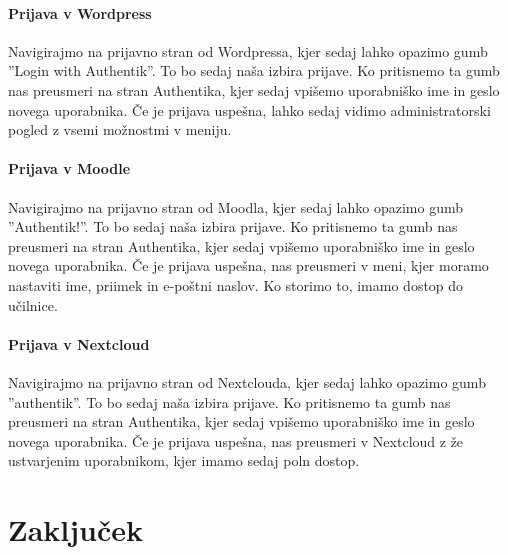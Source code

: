 \documentclass[a4paper,12pt,openright]{book}
\begin{document}
\subsubsection{Prijava v Wordpress}
Navigirajmo na prijavno stran od Wordpressa, kjer sedaj lahko opazimo gumb ''Login with Authentik''. To bo sedaj naša izbira prijave. Ko pritisnemo ta gumb nas preusmeri na stran Authentika, kjer sedaj vpišemo uporabniško ime in geslo novega uporabnika. Če je prijava uspešna, lahko sedaj vidimo administratorski pogled z vsemi možnostmi v meniju. 

\subsubsection{Prijava v Moodle}
Navigirajmo na prijavno stran od Moodla, kjer sedaj lahko opazimo gumb ''Authentik!''. To bo sedaj naša izbira prijave. Ko pritisnemo ta gumb nas preusmeri na stran Authentika, kjer sedaj vpišemo uporabniško ime in geslo novega uporabnika. Če je prijava uspešna, nas preusmeri v meni, kjer moramo nastaviti ime, priimek in e-poštni naslov. Ko storimo to, imamo dostop do učilnice. 

\subsubsection{Prijava v Nextcloud}
Navigirajmo na prijavno stran od Nextclouda, kjer sedaj lahko opazimo gumb ''authentik''. To bo sedaj naša izbira prijave. Ko pritisnemo ta gumb nas preusmeri na stran Authentika, kjer sedaj vpišemo uporabniško ime in geslo novega uporabnika. Če je prijava uspešna, nas preusmeri v Nextcloud z že ustvarjenim uporabnikom, kjer imamo sedaj poln dostop. 

\chapter{Zaključek}
\end{document}
